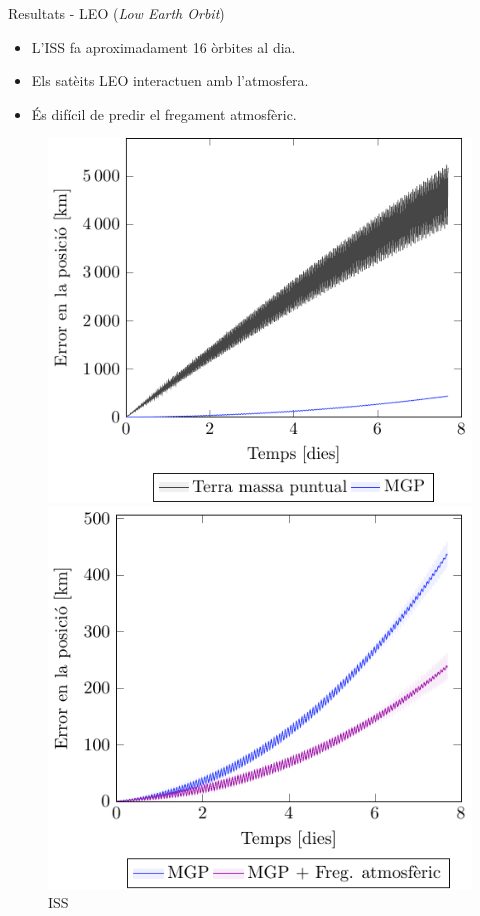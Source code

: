 \documentclass{beamer} %
\begin{document}
\begin{frame}{Resultats - LEO (\emph{Low Earth Orbit})}
  \begin{itemize}
    \item L'ISS fa aproximadament 16 òrbites al dia.
    \item Els satè\lgem its LEO interactuen amb l'atmosfera.
    \item És difícil de predir el fregament atmosfèric.
  \end{itemize}
  \begin{figure}[htbp]
    \centering
    \begin{minipage}[ht]{0.45\textwidth}
      \centering
      \includegraphics[width=\textwidth]{../Images/simulation/ISS_pointMass_comparison_ca.pdf}
      \caption{\hspace{0.8cm}ISS}
    \end{minipage}
    \hspace{0.0333333\textwidth}
    \begin{minipage}[ht]{0.45\textwidth}
      \centering
      \includegraphics[width=\textwidth]{../Images/simulation/ISS_ca.pdf}

\end{minipage}
\end{figure}
\end{frame}
\end{document}
